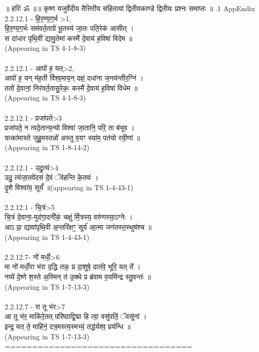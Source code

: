 \documentclass[17pt]{extarticle}
\begin{document}
        
        ॥ हरिः॑ ॐ ॥॥ कृष्ण यजुर्वेदीय तैत्तिरीय संहितायां द्वितीयकाण्डे द्वितीयः प्रश्नः समाप्तः ॥ \newline
        .1    AppEndix\\2.2.12.1 - हि॒र॒ण्य॒ग॒र्भ >1,\\हि॒र॒ण्य॒ग॒र्भः सम॑वर्त॒ताग्रे॑ भू॒तस्य॑ जा॒तः पति॒रेक॑ आसीत् ।\\स दा॑धार पृथि॒वीं द्यामु॒तेमां कस्मै॑ दे॒वाय॑ ह॒विषा॑ विदेम ॥\\(Appearing in TS 4-1-8-3)\\\\2.2.12.1 - आपो॑ ह॒ यत्>2, \\आपो॑ ह॒ यन् म॑ह॒ती र्विश्व॒माय॒न् दक्षं॒ दधा॑ना ज॒नय॑न्तीर॒ग्निं ।\\ततो॑ दे॒वानां॒ निर॑वर्त॒तासु॒रेकः॒ कस्मै॑ दे॒वाय॑ ह॒विषा॑ विधेम ॥\\(Appearing in TS 4-1-8-3)\\\\2.2.12.1 - प्रजा॑पते>3\\प्रजा॑पते॒ न त्वदे॒तान्य॒न्यो विश्वा॑ जा॒तानि॒ परि॒ ता ब॑भूव । \\यत्का॑मास्ते जुहु॒मस्तन्नो॑ अस्तु व॒यꣳ स्या॑म॒ पत॑यो रयी॒णां ॥\\(Appearing in TS 1-8-14-2)\\\\2.2.12.1 - उदु॒त्यं>4\\उदु॒ त्यंजा॒तवे॑दसं दे॒वं ॅव॑हन्ति के॒तवः॑ । \\दृ॒शे विश्वा॑य॒ सूर्यं᳚ ॥(appearing in TS 1-4-43-1)\\\\2.2.12.1 - चि॒त्रं>5\\चि॒त्रं दे॒वाना॒-मुद॑गा॒दनी॑कं॒ चक्षु॑ र्मि॒त्रस्य॒ वरु॑णस्या॒ऽग्नेः । \\आऽ प्रा॒ द्यावा॑पृथि॒वी अ॒न्तरि॑क्षꣳ॒॒ सूर्य॑ आ॒त्मा जग॑तस्त॒स्थुष॑श्च ॥\\(Appearing in TS 1-4-43-1)\\\\2.2.12.7- नो॑ मर्धी॒>6\\मा नो॑ मर्धी॒रा भ॑रा द॒द्धि तन्नः॒ प्र दा॒शुषे॒ दात॑वे॒ भूरि॒ यत् ते᳚ । \\नव्ये॑ दे॒ष्णे श॒स्ते अ॒स्मिन् त॑ उ॒क्थे प्र ब्र॑वाम व॒यमि॑न्द्र स्तु॒वन्तः॑ ॥\\(Appearing in TS 1-7-13-3)\\\\2.2.12.7 - रा तू भ॑र>7\\आ तू भ॑र॒ माकि॑रे॒तत् परि॑ष्ठाद्वि॒द्मा हि त्वा॒ वसु॑पतिं॒ ॅवसू॑नां । \\इन्द्र॒ यत् ते॒ माहि॑नं॒ दत्र॒मस्त्य॒स्मभ्यं॒ तद्ध॑र्यश्व॒ प्रय॑न्धि ॥\\(Appearing in TS 1-7-13-3)\\==================================\\
                \pagebreak
        
\end{document}
